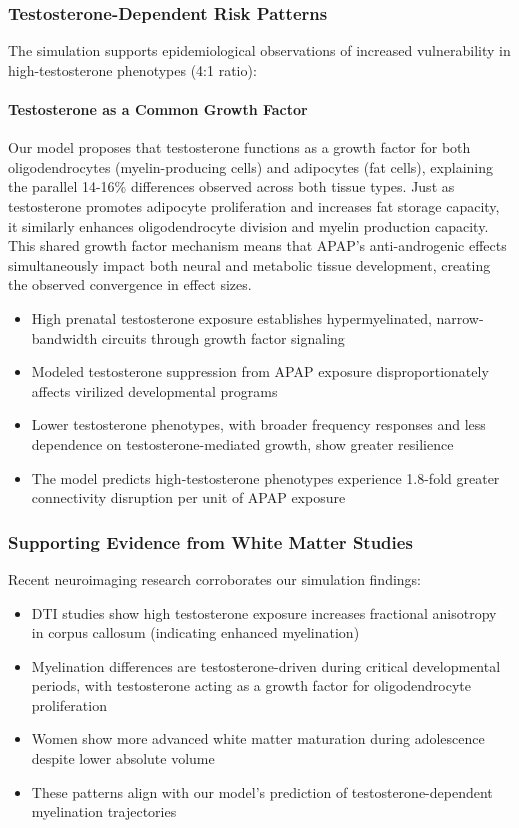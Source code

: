 \documentclass[11pt]{article}
\let\oldsubsubsection\subsubsection
\renewcommand{\subsubsection}[1]{\oldsubsubsection{#1}\setlength{\leftskip}{1.5em}}
\begin{document}
\subsubsection{Testosterone-Dependent Risk Patterns}

The simulation supports epidemiological observations of increased vulnerability in high-testosterone phenotypes (4:1 ratio):

\paragraph{Testosterone as a Common Growth Factor}
Our model proposes that testosterone functions as a growth factor for both oligodendrocytes (myelin-producing cells) and adipocytes (fat cells), explaining the parallel 14-16\% differences observed across both tissue types. Just as testosterone promotes adipocyte proliferation and increases fat storage capacity, it similarly enhances oligodendrocyte division and myelin production capacity. This shared growth factor mechanism means that APAP's anti-androgenic effects simultaneously impact both neural and metabolic tissue development, creating the observed convergence in effect sizes.

\begin{itemize}
\item High prenatal testosterone exposure establishes hypermyelinated, narrow-bandwidth circuits through growth factor signaling
\item Modeled testosterone suppression from APAP exposure disproportionately affects virilized developmental programs
\item Lower testosterone phenotypes, with broader frequency responses and less dependence on testosterone-mediated growth, show greater resilience
\item The model predicts high-testosterone phenotypes experience 1.8-fold greater connectivity disruption per unit of APAP exposure
\end{itemize}

\subsubsection{Supporting Evidence from White Matter Studies}

Recent neuroimaging research corroborates our simulation findings:

\begin{itemize}
\item DTI studies show high testosterone exposure increases fractional anisotropy in corpus callosum (indicating enhanced myelination)
\item Myelination differences are testosterone-driven during critical developmental periods, with testosterone acting as a growth factor for oligodendrocyte proliferation
\item Women show more advanced white matter maturation during adolescence despite lower absolute volume
\item These patterns align with our model's prediction of testosterone-dependent myelination trajectories
\end{itemize}
\end{document}

